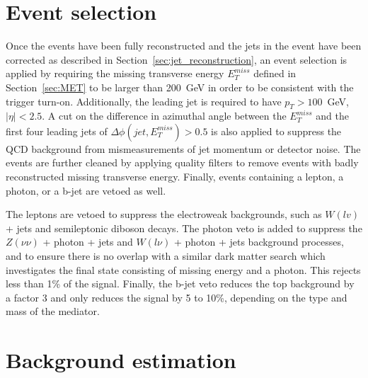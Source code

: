 \section{Event selection}
\label{sec:selection}

Once the events have been fully reconstructed and the jets in the event have been corrected as described in Section~\ref{sec:jet_reconstruction}, an event selection is applied by requiring the missing transverse energy $E_T^{miss}$ defined in Section~\ref{sec:MET} to be larger than 200~GeV in order to be consistent with the trigger turn-on. Additionally, the leading jet is required to have $p_T > 100$~GeV, $|\eta| < 2.5$. A cut on the difference in azimuthal angle between the $E_T^{miss}$ and the first four leading jets of $\Delta\phi(jet, E_T^{miss}) > 0.5$ is also applied to suppress the QCD background from mismeasurements of jet momentum or detector noise. The events are further cleaned by applying quality filters to remove events with badly reconstructed missing transverse energy. Finally, events containing a lepton, a photon, or a b-jet are vetoed as well.

The leptons are vetoed to suppress the electroweak backgrounds, such as $W(lv)$ + jets and semileptonic diboson decays. The photon veto is added to suppress the $Z(\nu\nu)$ + photon + jets and $W(l\nu)$ + photon + jets background processes, and to ensure there is no overlap with a similar dark matter search which investigates the final state consisting of missing energy and a photon. This rejects less than 1\% of the signal. Finally, the b-jet veto reduces the top background by a factor 3 and only reduces the signal by 5 to 10\%, depending on the type and mass of the mediator.

\section{Background estimation}
\label{sec:bkgd}

% 
% 
% 
% 

